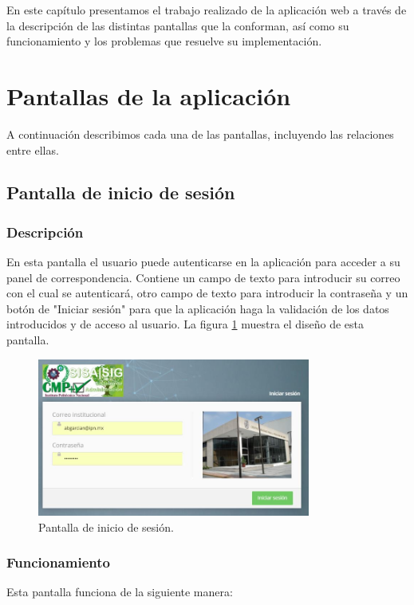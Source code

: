 	En este capítulo presentamos el trabajo realizado de la aplicación web a través de la descripción de las distintas pantallas que la conforman, así como  su funcionamiento y los problemas que resuelve su implementación.

\section{Pantallas de la aplicación}
	A continuación describimos cada una de las pantallas, incluyendo las relaciones entre ellas.
\subsection{Pantalla de inicio de sesión}
\subsubsection{Descripción}
	En esta pantalla el usuario puede autenticarse en la aplicación para acceder a su panel de correspondencia. Contiene un campo de texto para introducir su correo con el cual se autenticará, otro campo de texto para introducir la contraseña y un botón de "Iniciar sesión" para que la aplicación haga la validación de los datos introducidos y de acceso al usuario. La figura \ref{fig:Autenticacion} muestra el diseño de esta pantalla.		
		
	\begin{figure}[htbp!]
		\centering
			\includegraphics[width=0.8\textwidth]{Pantallas/iniciodesesion}
		\caption{Pantalla de inicio de sesión.}
		\label{fig:Autenticacion}
	\end{figure}

\subsubsection{Funcionamiento}
	Esta pantalla funciona de la siguiente manera:
	
